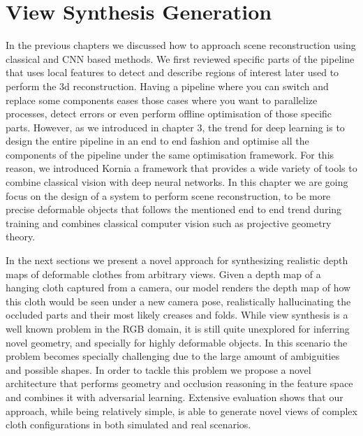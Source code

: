 \chapter{View Synthesis Generation}
\label{chap:chap_05}
\vspace{-8mm}

In the previous chapters we discussed how to approach scene reconstruction using classical and CNN based methods. We first reviewed specific parts of the pipeline that uses local features to detect and describe regions of interest later used to perform the 3d reconstruction. Having a pipeline where you can switch and replace some components eases those cases where you want to parallelize processes, detect errors or even perform offline optimisation of those specific parts. However, as we introduced in chapter 3, the trend for deep learning is to design the entire pipeline in an end to end fashion and optimise all the components of the pipeline under the same optimisation framework. For this reason, we introduced Kornia a framework that provides a wide variety of tools to combine classical vision with deep neural networks. In this chapter we are going focus on the design of a system to perform scene reconstruction, to be more precise deformable objects that follows the mentioned end to end trend during training and combines classical computer vision such as projective geometry theory.

In the next sections we present a novel approach for synthesizing realistic depth maps of deformable clothes from arbitrary views. Given a depth map of a hanging cloth captured from a camera, our model renders the depth map of how this cloth would be seen under a new camera pose, realistically hallucinating the occluded parts and their most likely creases and folds. While view synthesis is a well known problem in the RGB domain, it is still quite unexplored for inferring novel geometry, and specially for highly deformable objects. In this scenario the problem becomes specially challenging due to the large amount of ambiguities and possible shapes. In order to tackle this  problem we propose a novel architecture that performs geometry and occlusion reasoning in the feature space and combines it with adversarial learning. Extensive evaluation shows that our approach, while being relatively simple, is able to generate novel views of complex cloth configurations in both simulated and real scenarios. 

\newpage

